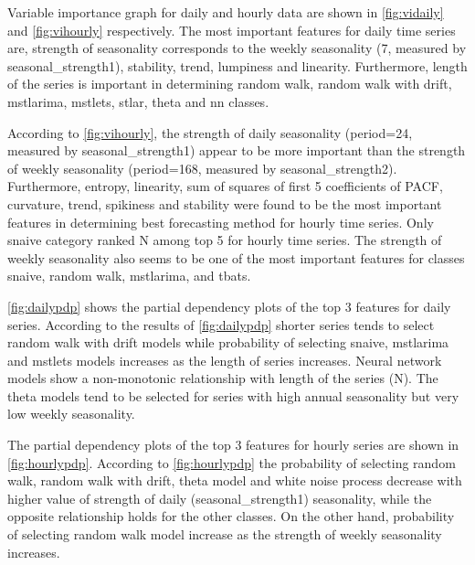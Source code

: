 \documentclass[11pt,a4paper,]{article}
\begin{document}
Variable importance graph for daily and hourly data are shown in
\autoref{fig:vidaily} and \autoref{fig:vihourly} respectively. The most
important features for daily time series are, strength of seasonality
corresponds to the weekly seasonality (7, measured by
seasonal\_strength1), stability, trend, lumpiness and linearity.
Furthermore, length of the series is important in determining random
walk, random walk with drift, mstlarima, mstlets, stlar, theta and nn
classes.

According to \autoref{fig:vihourly}, the strength of daily seasonality
(period=24, measured by seasonal\_strength1) appear to be more important
than the strength of weekly seasonality (period=168, measured by
seasonal\_strength2). Furthermore, entropy, linearity, sum of squares of
first 5 coefficients of PACF, curvature, trend, spikiness and stability
were found to be the most important features in determining best
forecasting method for hourly time series. Only snaive category ranked N
among top 5 for hourly time series. The strength of weekly seasonality
also seems to be one of the most important features for classes snaive,
random walk, mstlarima, and tbats.

\autoref{fig:dailypdp} shows the partial dependency plots of the top 3
features for daily series. According to the results of
\autoref{fig:dailypdp} shorter series tends to select random walk with
drift models while probability of selecting snaive, mstlarima and
mstlets models increases as the length of series increases. Neural
network models show a non-monotonic relationship with length of the
series (N). The theta models tend to be selected for series with high
annual seasonality but very low weekly seasonality.

The partial dependency plots of the top 3 features for hourly series are
shown in \autoref{fig:hourlypdp}. According to \autoref{fig:hourlypdp}
the probability of selecting random walk, random walk with drift, theta
model and white noise process decrease with higher value of strength of
daily (seasonal\_strength1) seasonality, while the opposite relationship
holds for the other classes. On the other hand, probability of selecting
random walk model increase as the strength of weekly seasonality
increases.
\end{document}
